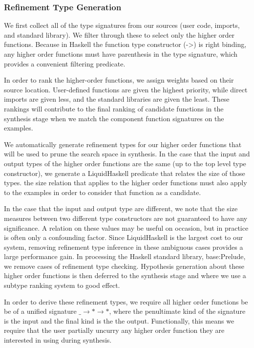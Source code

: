 \subsubsection{Refinement Type Generation}

We first collect all of the type signatures from our sources (user code, imports, and standard library). We filter through these to select only the higher order functions. Because in Haskell the function type constructor (->) is right binding, any higher order functions must have parenthesis in the type signature, which provides a convenient filtering predicate.

In order to rank the higher-order functions, we assign weights based on their source location. User-defined functions are given the highest priority, while direct imports are given less, and the standard libraries are given the least. These rankings will contribute to the final ranking of candidate functions in the synthesis stage when we match the component function signatures on the examples.

We automatically generate refinement types for our higher order functions that will be used to prune the search space in synthesis.
In the case that the input and output types of the higher order functions are the same (up to the top level type constructor), we generate a LiquidHaskell predicate that relates the size of those types.
the size relation that applies to the higher order functions must also apply to the examples in order to consider that function as a candidate.   

In the case that the input and output type are different, we note that the size measures between two different type constructors are not guaranteed to have any significance.
A relation on these values may be useful on occasion, but in practice is often only a confounding factor.
Since LiquidHaskell is the largest cost to our system, removing refinement type inference in these ambiguous cases provides a large performance gain.
In processing the Haskell standard library, base:Prelude, we remove  cases of refinement type checking.
Hypothesis generation about these higher order functions is then deferred to the synthesis stage and where we use a subtype ranking system to good effect.

In order to derive these refinement types, we require all higher order functions be be of a unified signature \texttt{$\_ \to * \to *$}, where the penultimate kind of the signature is the input and the final kind is the the output.  Functionally, this means we require that the user partially uncurry any higher order function they are interested in using during synthesis.

